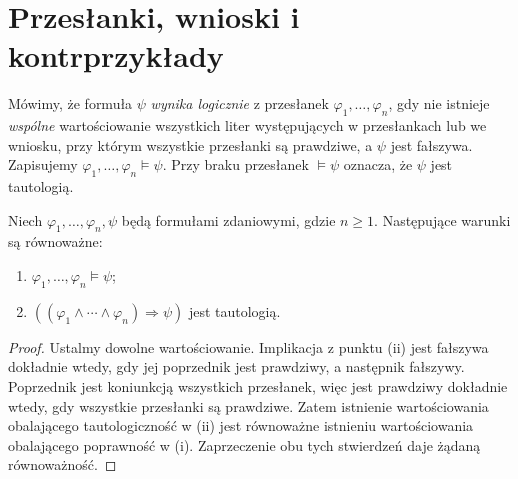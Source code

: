 \section{Przesłanki, wnioski i kontrprzykłady}\label{sec:logical-consequence}
\begin{definicja}
\label{def:consequence}
Mówimy, że formuła $\psi$ \emph{wynika logicznie}
z przesłanek $\varphi_1,\ldots,\varphi_n$, gdy nie istnieje
\emph{wspólne} wartościowanie wszystkich liter występujących
w przesłankach lub we wniosku, przy którym wszystkie przesłanki
są prawdziwe, a $\psi$ jest fałszywa. Zapisujemy
$\varphi_1,\ldots,\varphi_n\models\psi$.
Przy braku przesłanek $\models\psi$ oznacza, że
$\psi$ jest tautologią.
\end{definicja}

\begin{twierdzenie}
\label{thm:inference-test}
Niech $\varphi_1,\ldots,\varphi_n,\psi$ będą formułami
zdaniowymi, gdzie $n\ge1$. Następujące warunki są
równoważne:
\begin{enumerate}[label=(\roman*)]
\item $\varphi_1,\ldots,\varphi_n\models\psi$;
\item $((\varphi_1\land\cdots\land\varphi_n)\Rightarrow\psi)$
      jest tautologią.
\end{enumerate}
\end{twierdzenie}
\begin{proof}
Ustalmy dowolne wartościowanie. Implikacja z punktu
(ii) jest fałszywa dokładnie wtedy, gdy jej
poprzednik jest prawdziwy, a następnik fałszywy.
Poprzednik jest koniunkcją wszystkich przesłanek,
więc jest prawdziwy dokładnie wtedy, gdy wszystkie
przesłanki są prawdziwe. Zatem istnienie
wartościowania obalającego tautologiczność w (ii)
jest równoważne istnieniu wartościowania obalającego
poprawność w (i). Zaprzeczenie obu tych stwierdzeń
daje żądaną równoważność.
\end{proof}

